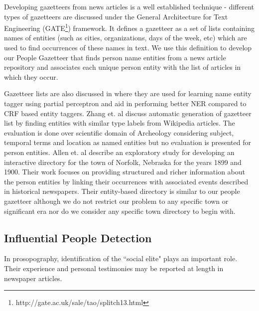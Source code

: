 Developing gazetteers from news articles is a well established technique - different types of gazetteers are discussed under the General Architecture for Text Engineering (GATE\footnote{http://gate.ac.uk/sale/tao/splitch13.html}) framework. It defines a gazetteer as a set of lists containing names of entities (such as cities, organizations, days of the week, etc) which are used to find occurrences of these names in text. We use this definition to develop our People Gazetteer that finds person name entities from a news article repository and associates each unique person entity with the list of articles in which they occur.

Gazetteer lists are also discussed in \cite{carlson2009learning} where they are used for learning name entity tagger using partial perceptron and aid in performing better NER compared to CRF based entity taggers. Zhang et. al\cite{zhang2009novel} discuss automatic generation of gazetteer list by finding entities with similar type labels from Wikipedia articles. The evaluation is done over scientific domain of Archeology considering subject, temporal terms and location as named entities but no evaluation is presented for person entities. Allen et. al \cite{allen2013toward} describe an exploratory study for developing an interactive directory for the town of Norfolk, Nebraska for the years 1899 and 1900. Their work focuses on providing structured and richer information about the person entities by linking their occurrences with associated events described in historical newspapers. Their entity-based directory is similar to our people gazetteer although we do not restrict our problem to any specific town or significant era nor do we consider any specific town directory to begin with. 

\subsection{Influential People Detection}
In prosopography, identification of the ``social elite" plays an important role. Their experience and personal testimonies may be reported at length in newspaper articles. 


